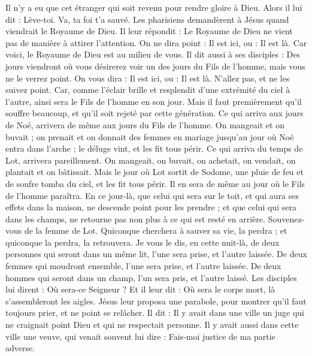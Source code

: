 \begin{multicols}{2}
Il n'y a eu que cet étranger qui soit revenu pour rendre gloire à Dieu.
Alors il lui dit : Lève-toi. Va, ta foi t'a sauvé.
Les pharisiens demandèrent à Jésus quand viendrait le Royaume de Dieu. Il leur répondit : Le Royaume de Dieu ne vient pas de manière à attirer l’attention.
On ne dira point : Il est ici, ou : Il est là. Car voici, le Royaume de Dieu est au milieu de vous.
Il dit aussi à ses disciples : Des jours viendront où vous désirerez voir un des jours du Fils de l'homme, mais vous ne le verrez point. On vous dira :
Il est ici, ou : Il est là. N’allez pas, et ne les suivez point.
Car, comme l'éclair brille et resplendit d’une extrémité du ciel à l’autre, ainsi sera le Fils de l’homme en son jour.
Mais il faut premièrement qu'il souffre beaucoup, et qu'il soit rejeté par cette génération.
Ce qui arriva aux jours de Noé, arrivera de même aux jours du Fils de l'homme.
On mangeait et on buvait ; on prenait et on donnait des femmes en mariage jusqu'au jour où Noé entra dans l'arche ; le déluge vint, et les fit tous périr.
Ce qui arriva du temps de Lot, arrivera pareillement. On mangeait, on buvait, on achetait, on vendait, on plantait et on bâtissait.
Mais le jour où Lot sortit de Sodome, une pluie de feu et de soufre tomba du ciel, et les fit tous périr.
Il en sera de même au jour où le Fils de l'homme paraîtra.
En ce jour-là, que celui qui sera sur le toit, et qui aura ses effets dans la maison, ne descende point pour les prendre ; et que celui qui sera dans les champs, ne retourne pas non plus à ce qui est resté en arrière.
Souvenez-vous de la femme de Lot.
Quiconque cherchera à sauver sa vie, la perdra ; et quiconque la perdra, la retrouvera.
Je vous le dis, en cette nuit-là, de deux personnes qui seront dans un même lit, l’une sera prise, et l'autre laissée.
De deux femmes qui moudront ensemble, l'une sera prise, et l'autre laissée.
De deux hommes qui seront dans un champ, l'un sera pris, et l'autre laissé.
Les disciples lui dirent : Où sera-ce Seigneur ? Et il leur dit : Où sera le corps mort, là s'assembleront les aigles.
\VerseOne{}Jésus leur proposa une parabole, pour montrer qu'il faut toujours prier, et ne point se relâcher.
Il dit : Il y avait dans une ville un juge qui ne craignait point Dieu et qui ne respectait personne.
Il y avait aussi dans cette ville une veuve, qui venait souvent lui dire : Fais-moi justice de ma partie adverse.

\end{multicols}
